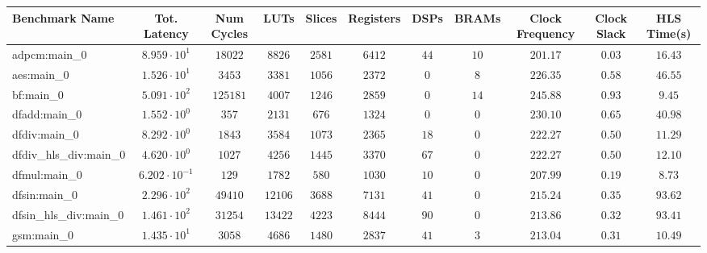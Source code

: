 \begin{tabular}{|l|c|c|c|c|c|c|c|c|c|c|}
\hline
Benchmark Name          & Tot. Latency            & Num Cycles & LUTs      & Slices    & Registers & DSPs    & BRAMs   & Clock Frequency & Clock Slack & HLS Time(s) \\
\hline
adpcm:main\_0           & $ 8.959 \cdot 10^{1}  $ & $ 18022  $ & $ 8826  $ & $ 2581  $ & $ 6412  $ & $ 44  $ & $ 10  $ & $ 201.17      $ & $ 0.03    $ & $ 16.43   $ \\
aes:main\_0             & $ 1.526 \cdot 10^{1}  $ & $ 3453   $ & $ 3381  $ & $ 1056  $ & $ 2372  $ & $ 0   $ & $ 8   $ & $ 226.35      $ & $ 0.58    $ & $ 46.55   $ \\
bf:main\_0              & $ 5.091 \cdot 10^{2}  $ & $ 125181 $ & $ 4007  $ & $ 1246  $ & $ 2859  $ & $ 0   $ & $ 14  $ & $ 245.88      $ & $ 0.93    $ & $ 9.45    $ \\
dfadd:main\_0           & $ 1.552 \cdot 10^{0}  $ & $ 357    $ & $ 2131  $ & $ 676   $ & $ 1324  $ & $ 0   $ & $ 0   $ & $ 230.10      $ & $ 0.65    $ & $ 40.98   $ \\
dfdiv:main\_0           & $ 8.292 \cdot 10^{0}  $ & $ 1843   $ & $ 3584  $ & $ 1073  $ & $ 2365  $ & $ 18  $ & $ 0   $ & $ 222.27      $ & $ 0.50    $ & $ 11.29   $ \\
dfdiv\_hls\_div:main\_0 & $ 4.620 \cdot 10^{0}  $ & $ 1027   $ & $ 4256  $ & $ 1445  $ & $ 3370  $ & $ 67  $ & $ 0   $ & $ 222.27      $ & $ 0.50    $ & $ 12.10   $ \\
dfmul:main\_0           & $ 6.202 \cdot 10^{-1} $ & $ 129    $ & $ 1782  $ & $ 580   $ & $ 1030  $ & $ 10  $ & $ 0   $ & $ 207.99      $ & $ 0.19    $ & $ 8.73    $ \\
dfsin:main\_0           & $ 2.296 \cdot 10^{2}  $ & $ 49410  $ & $ 12106 $ & $ 3688  $ & $ 7131  $ & $ 41  $ & $ 0   $ & $ 215.24      $ & $ 0.35    $ & $ 93.62   $ \\
dfsin\_hls\_div:main\_0 & $ 1.461 \cdot 10^{2}  $ & $ 31254  $ & $ 13422 $ & $ 4223  $ & $ 8444  $ & $ 90  $ & $ 0   $ & $ 213.86      $ & $ 0.32    $ & $ 93.41   $ \\
gsm:main\_0             & $ 1.435 \cdot 10^{1}  $ & $ 3058   $ & $ 4686  $ & $ 1480  $ & $ 2837  $ & $ 41  $ & $ 3   $ & $ 213.04      $ & $ 0.31    $ & $ 10.49   $ \\

\end{tabular}
